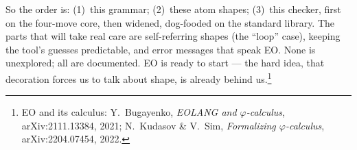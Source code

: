 \documentclass[10pt]{article}
\begin{document}
So the order is: (1)~this grammar; (2)~these atom shapes; (3)~this checker,
first on the four-move core, then widened, dog-fooded on the standard library.
The parts that will take real care are self-referring shapes (the ``loop''
case), keeping the tool's guesses predictable, and
error messages that speak EO. None is unexplored; all are documented. EO is
ready to start --- the hard idea, that decoration forces us to talk about shape,
is already behind us.\footnote{EO and its calculus: Y.~Bugayenko, \emph{EOLANG
and $\varphi$-calculus}, arXiv:2111.13384, 2021; N.~Kudasov \& V.~Sim,
\emph{Formalizing $\varphi$-calculus}, arXiv:2204.07454, 2022.}
\end{document}
